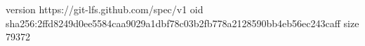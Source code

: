 version https://git-lfs.github.com/spec/v1
oid sha256:2ffd8249d0ee5584caa9029a1dbf78c03b2fb778a2128590bb4eb56ec243caff
size 79372
